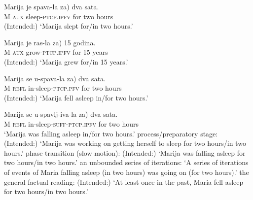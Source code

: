 \documentclass[output=paper]{langscibook}
\begin{document}
\ea\label{ars:ex:ambig}
		\begin{xlist}
	
	    \ex  \gll Marija je spava-la  za) dva sata.\\ 
        M \textsc{aux} sleep\textsc{-ptcp.ipfv} {} for two hours \\ 
        \glt (Intended:) `Marija slept for/in two hours.'\label{ars:ex:ambiga}
	    
	    \ex  \gll Marija je ras-la  za) 15 godina.\\ 
        M \textsc{aux} grow\textsc{-ptcp.ipfv} {} for 15 years \\ 
        \glt (Intended:) `Marija grew for\slash in 15 years.'\label{ars:ex:ambigb}
        
	    \ex  \gll Marija se u-spava-la \minsp{*(} za) dva sata.\\ 
        M \textsc{refl} in-sleep\textsc{-ptcp.pfv} {} for two hours \\
        \glt (Intended:) `Marija fell asleep in\slash for two hours.'\label{ars:ex:ambigc}

	    \ex  \gll Marija se u-spavlj-iva-la \minsp{(} za) dva sata.\\ 
        M \textsc{refl} in-sleep\textsc{-suff-ptcp.ipfv} {} for two hours \\
        \glt `Marija was falling asleep in\slash for two hours.'\label{ars:ex:ambigd}
        \ea process\slash preparatory stage: (Intended:) `Marija was working on getting herself to sleep for two hours\slash in two hours.'
        \ex phase transition (slow motion): (Intended:) `Marija was falling asleep for two hours\slash in two hours.'
        \ex an unbounded series of iterations: `A series of iterations of events of Maria falling asleep (in two hours) was going on (for two hours).'
        \ex the general-factual reading: (Intended:) `At least once in the past, Maria fell asleep for two hours\slash in two hours.'
        \z

       	\end{xlist}
\z
\end{document}
